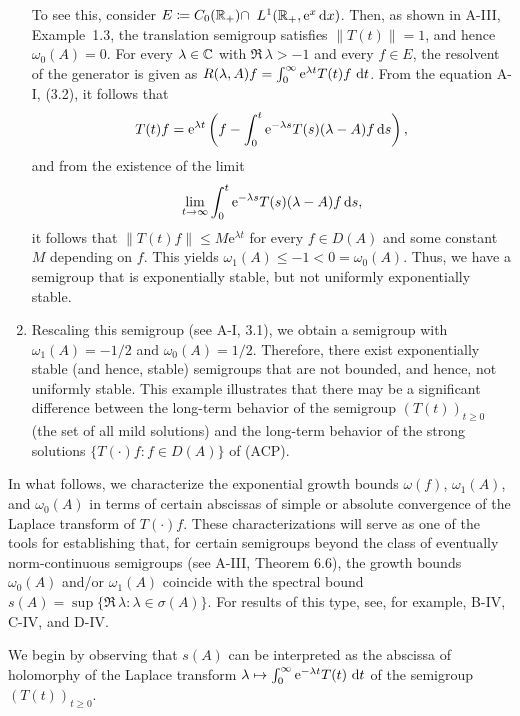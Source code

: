 \begin{example}
\begin{enumerate}[\upshape (i), wide, labelindent=.5em]
To see this, consider $E \coloneqq C_0(\mathbb{R}_{+}) \cap $ $L^{1}(\mathbb{R}_{+},\mathrm{e}^{x}\mathop{}\!\mathrm{d}{x})$. Then, as shown in A-III, Example~1.3, the translation semigroup satisfies $\|T(t)\| = 1$, and hence $\omega_{0}(A) = 0$. 
For every $\lambda \in \mathbb{C}$ with $\Re\,\lambda > -1$ and every $f \in E$, the resolvent of the generator is given as $R(\lambda,A)f = \int_{0}^{\infty} \mathrm{e}^{\lambda t} T(t)f \,\mathop{}\!\mathrm{d}{t}$.
From the equation A-I, (3.2), it follows that
\[
T(t)f = \mathrm{e}^{\lambda t}\left(f - \int_{0}^{t} \mathrm{e}^{-\lambda s} T(s) (\lambda - A)f  \mathop{}\!\mathrm{d}{s}\right),
\]
and from the existence of the limit
\[
\lim_{t \to \infty} \int_{0}^{t} \mathrm{e}^{-\lambda s} T(s) (\lambda - A)f  \mathop{}\!\mathrm{d}{s},
\] 
it follows that 
$\|T(t)f\| \leq M\mathrm{e}^{\lambda t}$ for every $f \in D(A)$ and some constant $M$ depending on $f$. This yields $\omega_{1}(A) \le -1 < 0 = \omega_{0}(A)$. 
Thus, we have a semigroup that is exponentially stable, but not uniformly exponentially stable.

\item
Rescaling this semigroup (see A-I, 3.1), we obtain a semigroup with $\omega_{1}(A) = -1/2 $ and 
$\omega_{0}(A) = 1/2 $.
Therefore, there exist exponentially stable (and hence, stable) semigroups that are not bounded, and hence, not uniformly stable.
This example illustrates that there may be a significant difference between the long-term behavior of the semigroup $(T(t))_{t \geq 0}$ (\ie the set of all mild solutions) and the long-term behavior of the strong solutions $\{T(\cdot)f \colon f \in D(A)\}$ of (ACP). 
\end{enumerate}
\end{example}
In what follows, we characterize the exponential growth bounds $\omega(f)$, $\omega_{1}(A)$, and $\omega_{0}(A)$ in terms of certain abscissas of simple or absolute convergence of the Laplace transform of $T(\cdot)f$. 
These characterizations will serve as one of the tools for 
establishing that, for certain semigroups beyond the class of eventually norm-continuous semigroups (see A-III, Theorem 6.6), the growth bounds $\omega_{0}(A)$ and/or $\omega_{1}(A)$ coincide with the spectral bound $s(A) = \sup\{\Re\,\lambda\colon\lambda \in \sigma(A)\}$. For results of this type, see, for example, B-IV, C-IV, and D-IV.

We begin by observing that $s(A)$ can be interpreted as the abscissa of holomorphy of the Laplace transform $\lambda \mapsto \int_{0}^{\infty} \mathrm{e}^{-\lambda t} T(t) \,\mathop{}\!\mathrm{d}{t}$ of the semigroup $(T(t))_{t \geq 0}$.


